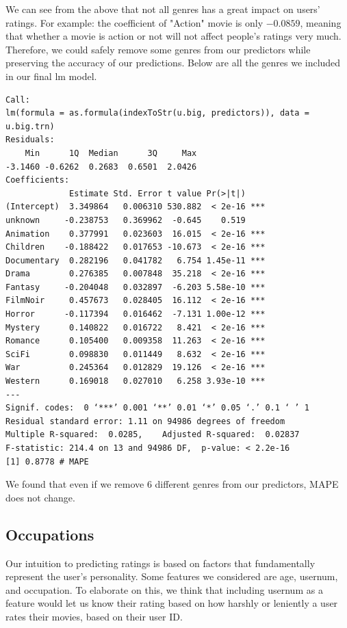 \documentclass[11pt]{article}
\begin{document}
We can see from the above that not all genres has a great impact on
users' ratings. For example: the coefficient of "Action" movie is 
only $-0.0859$, meaning that whether a movie is action or not will
not affect people's ratings very much. Therefore, we could safely 
remove some genres from our predictors while preserving the 
accuracy of our predictions. Below are all the genres we 
included in our final lm model.
\begin{verbatim}
Call:
lm(formula = as.formula(indexToStr(u.big, predictors)), data = u.big.trn)
Residuals:
    Min      1Q  Median      3Q     Max 
-3.1460 -0.6262  0.2683  0.6501  2.0426 
Coefficients:
             Estimate Std. Error t value Pr(>|t|)    
(Intercept)  3.349864   0.006310 530.882  < 2e-16 ***
unknown     -0.238753   0.369962  -0.645    0.519    
Animation    0.377991   0.023603  16.015  < 2e-16 ***
Children    -0.188422   0.017653 -10.673  < 2e-16 ***
Documentary  0.282196   0.041782   6.754 1.45e-11 ***
Drama        0.276385   0.007848  35.218  < 2e-16 ***
Fantasy     -0.204048   0.032897  -6.203 5.58e-10 ***
FilmNoir     0.457673   0.028405  16.112  < 2e-16 ***
Horror      -0.117394   0.016462  -7.131 1.00e-12 ***
Mystery      0.140822   0.016722   8.421  < 2e-16 ***
Romance      0.105400   0.009358  11.263  < 2e-16 ***
SciFi        0.098830   0.011449   8.632  < 2e-16 ***
War          0.245364   0.012829  19.126  < 2e-16 ***
Western      0.169018   0.027010   6.258 3.93e-10 ***
---
Signif. codes:  0 ‘***’ 0.001 ‘**’ 0.01 ‘*’ 0.05 ‘.’ 0.1 ‘ ’ 1
Residual standard error: 1.11 on 94986 degrees of freedom
Multiple R-squared:  0.0285,	Adjusted R-squared:  0.02837 
F-statistic: 214.4 on 13 and 94986 DF,  p-value: < 2.2e-16
[1] 0.8778 # MAPE
\end{verbatim}

We found that even if we remove 6 different genres from our 
predictors, MAPE does not change.

\subsection{Occupations}
Our intuition to predicting ratings is based on factors that fundamentally represent the user's
personality. Some features we considered are age, usernum, and occupation. To elaborate on this,
we think that including usernum as a feature would let us know their rating based on how harshly
or leniently a user rates their movies, based on their user ID. 
\end{document}
